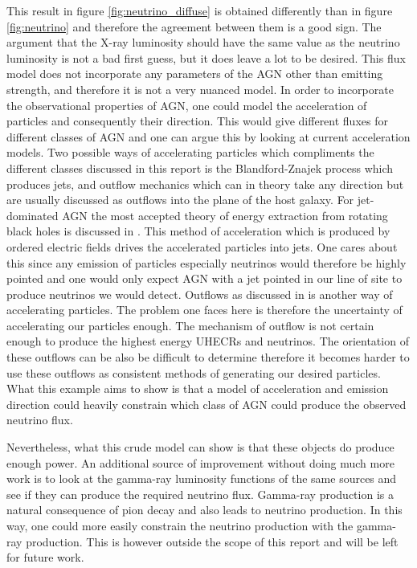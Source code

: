 This result in figure \ref*{fig:neutrino_diffuse} is obtained differently than in figure \ref*{fig:neutrino} and therefore the agreement between them is a good sign. The argument that the X-ray luminosity should have the same value as the neutrino luminosity is not a bad first guess, but it does leave a lot to be desired. 
This flux model does not incorporate any parameters of the AGN other than emitting strength, and therefore it is not a very nuanced model. 
In order to incorporate the observational properties of AGN, one could model the acceleration of particles and consequently their direction. This would give different fluxes for different classes of AGN and one can argue this by looking at current acceleration models. 
Two possible ways of accelerating particles which compliments the different classes discussed in this report is the Blandford-Znajek process which produces jets, and outflow mechanics which can in theory take any direction but are usually discussed as outflows into the plane of the host galaxy.
For jet-dominated AGN the most accepted theory of energy extraction from rotating black holes is discussed in \cite{Blandford_1977}. This method of acceleration which is produced by ordered electric fields drives the accelerated particles into jets. One cares about this since any emission of particles especially neutrinos would therefore be highly pointed and one would only expect 
AGN with a jet pointed in our line of site to produce neutrinos we would detect. 
Outflows as discussed in \cite{Laha_2021} is another way of accelerating particles. The problem one faces here is 
therefore the uncertainty of accelerating our particles enough. The mechanism of outflow is not certain enough to produce the highest energy UHECRs and neutrinos. The orientation of these outflows can be also be difficult to determine therefore it becomes harder to use these outflows as consistent methods of generating our desired particles.
What this example aims to show is that a model of acceleration and emission direction could heavily constrain which class of AGN could produce the observed neutrino flux.

Nevertheless, what this crude model can show is that these objects do produce enough power. An additional source of improvement without doing much more work is to look at the gamma-ray luminosity functions of the same sources and see if they can produce the required neutrino flux. Gamma-ray production is a natural consequence of pion decay and also leads to neutrino production.
In this way, one could more easily constrain the neutrino production with the gamma-ray production. 
This is however outside the scope of this report and will be left for future work. 




